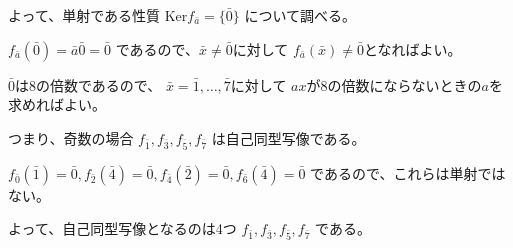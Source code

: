 \documentclass[12pt,b5paper]{ltjsarticle}
\begin{document}
\begin{enumerate}
      よって、単射である性質
      $\mathrm{Ker}f_{\bar{a}} = \{\bar{0}\}$
      について調べる。

      $f_{\bar{a}}(\bar{0})=\bar{a}\bar{0}=\bar{0}$
      であるので、$\bar{x}\ne \bar{0}$に対して
      $f_{\bar{a}}(\bar{x})\ne \bar{0}$となればよい。

      $\bar{0}$は8の倍数であるので、
      $\bar{x}=\bar{1},\dots,\bar{7}$に対して
      $ax$が8の倍数にならないときの$a$を求めればよい。

      つまり、奇数の場合
      $f_{\bar{1}},f_{\bar{3}},f_{\bar{5}},f_{\bar{7}}$
      は自己同型写像である。

      $f_{\bar{0}}(\bar{1})=\bar{0},f_{\bar{2}}(\bar{4})=\bar{0},
      f_{\bar{4}}(\bar{2})=\bar{0},f_{\bar{6}}(\bar{4})=\bar{0}$
      であるので、これらは単射ではない。

      よって、自己同型写像となるのは4つ
      $f_{\bar{1}},f_{\bar{3}},f_{\bar{5}},f_{\bar{7}}$
      である。


\end{enumerate}

\hrulefill
\end{document}
